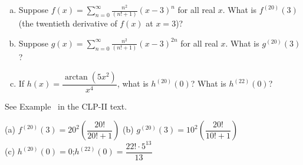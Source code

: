\begin{Mquestion}
\begin{enumerate}[(a)]
\item Suppose $f(x)=\displaystyle\sum_{n=0}^\infty \frac{n^2}{(n!+1)}(x-3)^n$ for all real $x$. What is $f^{(20)}(3)$ (the twentieth derivative of $f(x)$ at $x=3$)?
\item Suppose $g(x)=\displaystyle\sum_{n=0}^\infty \frac{n^2}{(n!+1)}(x-3)^{2n}$ for all real $x$. What is $g^{(20)}(3)$?
\item If $h(x)=\dfrac{\arctan(5x^2)}{x^4}$, what is $h^{(20)}(0)$? What is $h^{(22)}(0)$?
\end{enumerate}
\end{Mquestion}
\begin{hint}
See Example~ in the CLP-II text.
\end{hint}
\begin{answer}
(a) $f^{(20)}(3)=20^2\left(\dfrac{20!}{20!+1}\right)$\qquad
(b) $g^{(20)}(3)=10^2\left(\dfrac{20!}{10!+1}\right)$\\
(c) $h^{(20)}(0)=0$;\quad $h^{(22)}(0)=\dfrac{22!\cdot 5^{13}}{13}$
\end{answer}
